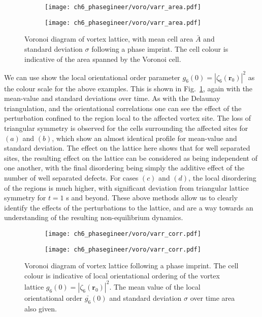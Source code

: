 \begin{figure}\ContinuedFloat\centering
    \begin{subfigure}{0.6\textwidth}
        \texttt{[image: ch6\_phasegineer/voro/varr\_area.pdf]}
    \end{subfigure}
    \begin{subfigure}{0.6\textwidth}
        \texttt{[image: ch6\_phasegineer/voro/varr\_area.pdf]}
    \end{subfigure}
    \caption{Voronoi diagram of vortex lattice, with mean cell area $\bar{A}$ and standard deviation $\sigma$ following a phase imprint. The cell colour is indicative of the area spanned by the Voronoi cell.}
\end{figure}

We can use show the local orientational order parameter $g_6(0) = |\zeta_6(\mathbf{r}_0)|^2$ as the colour scale for the above examples. This is shown in Fig.~\ref{fig:voronoiscorr}, again with the mean-value and standard deviations over time. As with the Delaunay triangulation, and the orientational correlations one can see the effect of the perturbation confined to the region local to the affected vortex site. The loss of triangular symmetry is observed for the cells surrounding the affected sites for $(a)$ and $(b)$, which show an almost identical profile for mean-value and standard deviation. The effect on the lattice here shows that for well separated sites, the resulting effect on the lattice can be considered as being independent of one another, with the final disordering being simply the additive effect of the number of well separated defects. For cases $(c)$ and $(d)$, the local disordering of the regions is much higher, with significant deviation from triangular lattice symmetry for $t=1$ s and beyond. These above methods allow us to clearly identify the effects of the perturbations to the lattice, and are a way towards an understanding of the resulting non-equilibrium dynamics.

\begin{figure}\centering
    \begin{subfigure}{0.6\textwidth}
        \texttt{[image: ch6\_phasegineer/voro/varr\_corr.pdf]}
    \end{subfigure}
    \begin{subfigure}{0.6\textwidth}
        \texttt{[image: ch6\_phasegineer/voro/varr\_corr.pdf]}
    \end{subfigure}
    \caption{Voronoi diagram of vortex lattice following a phase imprint. The cell colour is indicative of local orientational ordering of the vortex lattice $g_6(0) = |\zeta_6(\mathbf{r}_0)|^2$. The mean value of the local orientational order $\bar{g_6}(0)$ and standard deviation $\sigma$ over time area also given.}\label{fig:voronoiscorr}
\end{figure}

